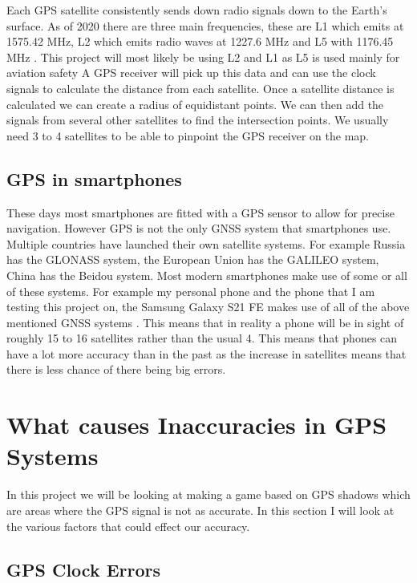 \documentclass{l4proj}
\begin{document}
Each GPS satellite consistently sends down radio signals down to the Earth's surface. As of 2020 there are three main frequencies,
these are L1 which emits at 1575.42 MHz, L2 which emits radio waves at 1227.6 MHz and L5 with 1176.45 MHz \citep{spsStandard}. This project
will most likely be using L2 and L1 as L5 is used mainly for aviation safety \citep{Xu2016} A GPS receiver will pick up this data and can use the clock signals to calculate the distance from each satellite. Once a 
satellite distance is calculated we can create a radius of equidistant points. We can then add the signals from several other
satellites to find the intersection points. We usually need 3 to 4 satellites to be able to pinpoint the GPS receiver on the map. \citep{Rabbany2006}




\subsection{GPS in smartphones}
These days most smartphones are fitted with a GPS sensor to allow for precise navigation. However GPS is not the only GNSS
system that smartphones use. Multiple countries have launched their own satellite systems. For example Russia has the GLONASS
system, the European Union has the GALILEO system, China has the Beidou system. Most modern smartphones make use
of some or all of these systems. For example my personal phone and the phone that I am testing this project on, the Samsung 
Galaxy S21 FE makes use of all of the above mentioned GNSS systems \citep{samsungs21specs}. This means that in reality
a phone will be in sight of roughly 15 to 16 satellites rather than the usual 4. This means that phones can
have a lot more accuracy than in the past as the increase in satellites means that there is less chance of there being big
errors.

\section{What causes Inaccuracies in GPS Systems}
In this project we will be looking at making a game based on GPS shadows which are areas where the GPS signal is not as accurate. In this section I will look
at the various factors that could effect our accuracy.

\subsection{GPS Clock Errors}
\end{document}
